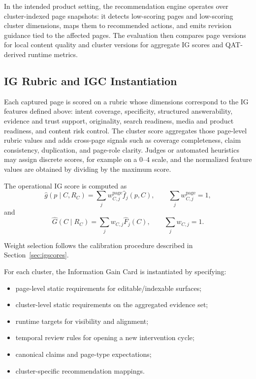 \documentclass{article}
\begin{document}
In the intended product setting, the recommendation engine operates over cluster-indexed page snapshots: it detects low-scoring pages and low-scoring cluster dimensions, maps them to recommended actions, and emits revision guidance tied to the affected pages. The evaluation then compares page versions for local content quality and cluster versions for aggregate IG scores and QAT-derived runtime metrics.

\subsection{IG Rubric and IGC Instantiation}

Each captured page is scored on a rubric whose dimensions correspond to the IG features defined above: intent coverage, specificity, structured answerability, evidence and trust support, originality, search readiness, media and product readiness, and content risk control. The cluster score aggregates those page-level rubric values and adds cross-page signals such as coverage completeness, claim consistency, duplication, and page-role clarity. Judges or automated heuristics may assign discrete scores, for example on a \(0\)--\(4\) scale, and the normalized feature values are obtained by dividing by the maximum score.

The operational IG score is computed as
\[
\hat{g}(p \mid C,R_C)=\sum_j w^{\text{page}}_{C,j}\hat{f}_j(p,C),
\qquad
\sum_j w^{\text{page}}_{C,j} = 1,
\]
and
\[
\hat{G}(C \mid R_C)=\sum_j w_{C,j}\hat{F}_j(C),
\qquad
\sum_j w_{C,j} = 1.
\]

Weight selection follows the calibration procedure described in Section~\ref{sec:igscores}.

For each cluster, the Information Gain Card is instantiated by specifying:
\begin{itemize}
    \item page-level static requirements for editable/indexable surfaces;
    \item cluster-level static requirements on the aggregated evidence set;
    \item runtime targets for visibility and alignment;
    \item temporal review rules for opening a new intervention cycle;
    \item canonical claims and page-type expectations;
    \item cluster-specific recommendation mappings.
\end{itemize}
\end{document}
